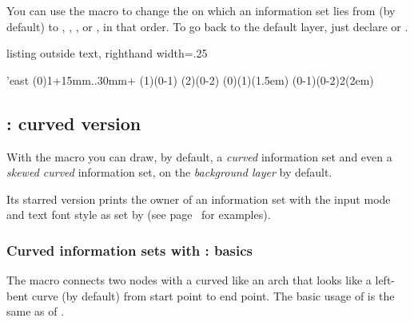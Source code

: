 \subsubsection{\protect\cmd{\setxtinfosetlayer}}
\label{sec:setxtinfosetlayer}

You can use the macro \icmd{\setxtinfosetlayer} to change the  on which an information set lies from  (by default) to , , , or , in that order.
To go back to the default layer, just declare \cmd{\setxtinfosetlayer} or \cmd{\setxtinfosetlayer\{\}}.

\begin{tcblisting}{listing outside text, righthand width=.25\linewidth}
\begin{istgame}
\setistgrowdirection'{east}
\istroot(0){1}+15mm..30mm+     \endist
\istroot(1)(0-1)      \endist
\istroot(2)(0-2)    \endist
{}
\xtInfosetO[fill=red,ellipse,opacity=.2](0)(1)(1.5em)
\setxtinfosetlayer
\xtInfosetO[fill=blue!20](0-1)(0-2){2}(2em)
\end{istgame}
\end{tcblisting}


\subsection{\protect\cmd{\xtCInfoset}: curved version}
\label{ssec:xtCInfoset}

With the macro \icmd{\xtCInfoset} you can draw, by default, a \emph{curved} information set and even a \emph{skewed curved} information set, on the \emph{background layer} by default. 

Its starred version \icmd{\xtCInfoset*} prints the owner of an information set with the input mode and text font style as set by \cmd{\setistmathTF(*)} (see page~\pageref{page:xtCInfoset*} for examples).

\subsubsection{Curved information sets with \protect\cmd{\xtCInfoset}: basics}

The macro \icmd{\xtCInfoset} connects two nodes with a curved  like an arch that looks like a left-bent curve (by default) from start point to end point.
The basic usage of \cmd{\xtCInfoset} is the same as of \cmd{\xtInfoset}.

